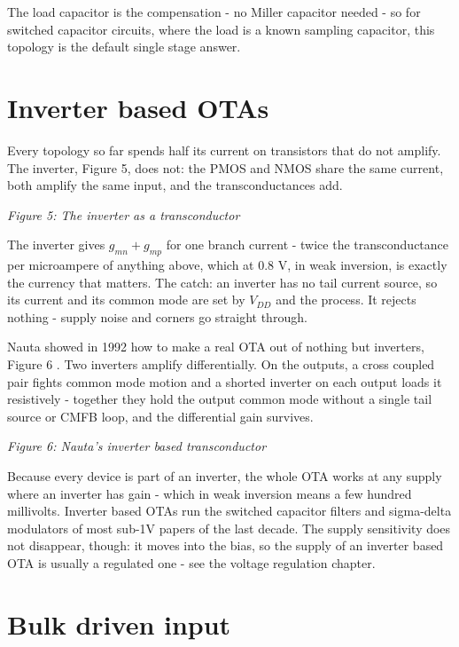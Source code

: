 The load capacitor is the compensation - no Miller capacitor needed - so
for switched capacitor circuits, where the load is a known sampling
capacitor, this topology is the default single stage answer.

\section{Inverter based OTAs}\label{inverter-based-otas}

Every topology so far spends half its current on transistors that do not
amplify. The inverter, Figure 5, does not: the PMOS and NMOS share the
same current, both amplify the same input, and the transconductances
add.


{
\centering
{}
}

\emph{Figure 5: The inverter as a transconductor}

The inverter gives \(g_{mn} + g_{mp}\) for one branch current - twice
the transconductance per microampere of anything above, which at 0.8 V,
in weak inversion, is exactly the currency that matters. The catch: an
inverter has no tail current source, so its current and its common mode
are set by \(V_{DD}\) and the process. It rejects nothing - supply noise
and corners go straight through.

Nauta showed in 1992 how to make a real OTA out of nothing but
inverters, Figure 6 . Two inverters
amplify differentially. On the outputs, a cross coupled pair fights
common mode motion and a shorted inverter on each output loads it
resistively - together they hold the output common mode without a single
tail source or CMFB loop, and the differential gain survives.


{
\centering
{}
}

\emph{Figure 6: Nauta's inverter based transconductor}

Because every device is part of an inverter, the whole OTA works at any
supply where an inverter has gain - which in weak inversion means a few
hundred millivolts. Inverter based OTAs run the switched capacitor
filters and sigma-delta modulators of most sub-1V papers of the last
decade. The supply sensitivity does not disappear, though: it moves into
the bias, so the supply of an inverter based OTA is usually a regulated
one - see the voltage regulation chapter.

\section{Bulk driven input}\label{bulk-driven-input}

